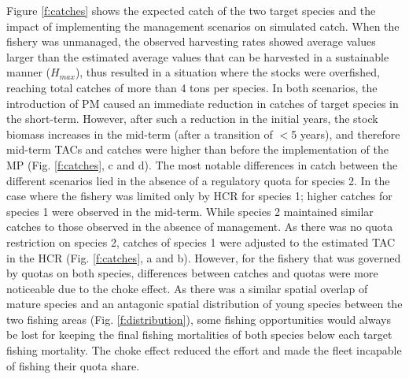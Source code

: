 \documentclass[12pt,oneline,a4paper,numbib]{ouparticle}
\numberwithin{equation}{subsection} %
\begin{document}
Figure \ref{f:catches} shows the expected catch of the two target species and the impact of implementing the management scenarios on simulated catch. When the fishery was unmanaged, the observed harvesting rates showed average values larger than the estimated average values that can be harvested in a sustainable manner ($H_{max}$), thus resulted in a situation where the stocks were overfished, reaching total catches of more than 4 tons per species. In both scenarios, the introduction of PM caused an immediate reduction in catches of target species in the short-term. However, after such a reduction in the initial years, the stock biomass increases in the mid-term (after a transition of $<$5 years), and therefore mid-term TACs and catches were higher than before the implementation of the MP (Fig. \ref{f:catches}, c and d). The most notable differences in catch between the different scenarios lied in the absence of a regulatory quota for species 2. In the case where the fishery was limited only by HCR for species 1; higher catches for species 1 were observed in the mid-term. While species 2 maintained similar catches to those observed in the absence of management. As there was no quota restriction on species 2, catches of species 1 were adjusted to the estimated TAC in the HCR (Fig. \ref{f:catches}, a and b). However, for the fishery that was governed by quotas on both species, differences between catches and quotas were more noticeable due to the choke effect. As there was a similar spatial overlap of mature species and an antagonic spatial distribution of young species between the two fishing areas (Fig. \ref{f:distribution}), some fishing opportunities would always be lost for keeping the final fishing mortalities of both species below each target fishing mortality. The choke effect reduced the effort and made the fleet incapable of fishing their quota share.
\end{document}
